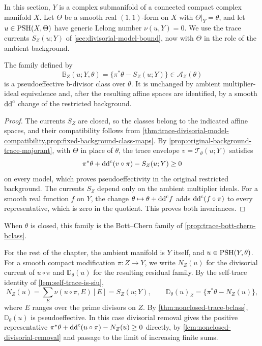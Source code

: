 In this section, $Y$ is a complex submanifold of a connected compact complex manifold $X$. Let $\Theta$ be a smooth real $(1,1)$-form on $X$ with $\Theta|_Y=\theta$, and let $u\in\mathrm{PSH}(X,\Theta)$ have generic Lelong number $\nu(u,Y)=0$. We use the trace currents $S_Z(u;Y)$ of \cref{sec:divisorial-model-bound}, now with $\Theta$ in the role of the ambient background.

\begin{theorem}\label{thm:nonclosed-trace-bclass}
The family defined by
\[
 \mathbb B_Z(u;Y,\theta)
 =\{\pi^*\theta-S_Z(u;Y)\}\in\mathscr A_Z(\theta)
\]
is a pseudoeffective b-divisor class over $\theta$. It is unchanged by ambient multiplier-ideal equivalence and, after the resulting affine spaces are identified, by a smooth $\mathrm{dd}^{\mathrm{c}}$ change of the restricted background.
\end{theorem}
\begin{proof}
The currents $S_Z$ are closed, so the classes belong to the indicated affine spaces, and their compatibility follows from \cref{thm:trace-divisorial-model-compatibility,prop:fixed-background-class-maps}. By \cref{prop:original-background-trace-majorant}, with $\Theta$ in place of $\theta$, the trace envelope $v=\mathcal T_\theta(u;Y)$ satisfies
\[
 \pi^*\theta+\mathrm{dd}^{\mathrm{c}}(v\circ\pi)-S_Z(u;Y)\geq0
\]
on every model, which proves pseudoeffectivity in the original restricted background. The currents $S_Z$ depend only on the ambient multiplier ideals. For a smooth real function $f$ on $Y$, the change $\theta\mapsto\theta+\mathrm{dd}^{\mathrm{c}} f$ adds $\mathrm{dd}^{\mathrm{c}}(f\circ\pi)$ to every representative, which is zero in the quotient. This proves both invariances.
\end{proof}

When $\theta$ is closed, this family is the Bott--Chern family of \cref{prop:trace-bott-chern-bclass}.



For the rest of the chapter, the ambient manifold is $Y$ itself, and $u\in\mathrm{PSH}(Y,\theta)$. For a smooth compact modification $\pi\colon Z\to Y$, we write $N_Z(u)$ for the divisorial current of $u\circ\pi$ and $\mathbb D_\theta(u)$ for the resulting residual family. By the self-trace identity of \cref{lem:self-trace-is-siu},
\[
 N_Z(u)=\sum_E\nu(u\circ\pi,E)[E]=S_Z(u;Y),
 \qquad \mathbb D_\theta(u)_Z=\{\pi^*\theta-N_Z(u)\},
\]
where $E$ ranges over the prime divisors on $Z$. By \cref{thm:nonclosed-trace-bclass}, $\mathbb D_\theta(u)$ is pseudoeffective. In this case divisorial removal gives the positive representative $\pi^*\theta+\mathrm{dd}^{\mathrm{c}}(u\circ\pi)-N_Z(u)\geq0$ directly, by \cref{lem:nonclosed-divisorial-removal} and passage to the limit of increasing finite sums.

